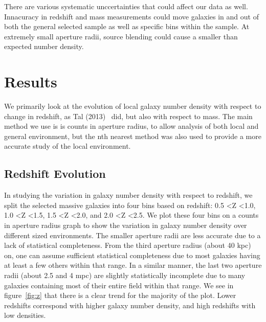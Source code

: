 \documentclass[apj]{emulateapj}
\begin{document}
There are various systematic unccertainties that could affect our data as well. Innacuracy in redshift and mass measurements could move galaxies in and out of both the general selected sample as well as specific bins within the sample. At extremely small aperture radii, source blending could cause a smaller than expected number density. 

\section{Results}

We primarily look at the evolution of local galaxy number density with respect to change in redshift, as Tal (2013)~\cite{2013ApJ...769...31T} did, but also with respect to mass. The main method we use is is counts in aperture radius, to allow analysis of both local and general environment, but the nth nearest method was also used to provide a more accurate study of the local environment.

\subsection{Redshift Evolution}

In studying the variation in galaxy number density with respect to redshift, we split the selected massive galaxies into four bins based on redshift: 0.5 \textless Z \textless 1.0, 1.0 \textless Z \textless 1.5, 1.5 \textless Z \textless 2.0, and 2.0 \textless Z \textless 2.5. We plot these four bins on a counts in aperture radius graph to show the variation in galaxy number density over different sized environments. The smaller aperture radii are less accurate due to a lack of statistical completeness. From the third aperture radius (about 40 kpc) on, one can assume sufficient statistical completeness due to most galaxies having at least a few others within that range. In a similar manner, the last two aperture radii (about 2.5 and 4 mpc) are slightly statistically incomplete due to many galaxies containing most of their entire field within that range. We see in figure~\ref{fig:z} that there is a clear trend for the majority of the plot. Lower redshifts correspond with higher galaxy number density, and high redshifts with low densities. 
\end{document}
